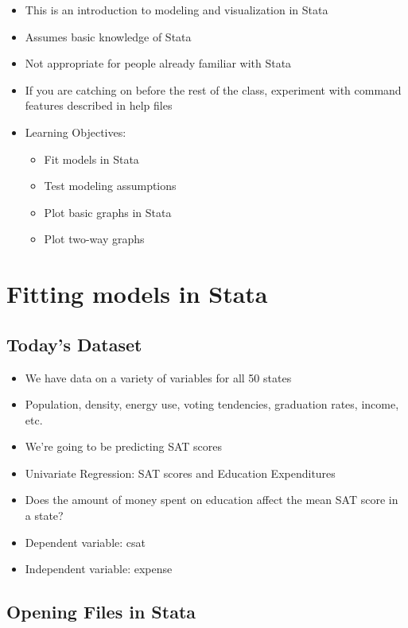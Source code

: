 \documentclass[]{book}
\providecommand{\tightlist}{%
  \setlength{\itemsep}{0pt}\setlength{\parskip}{0pt}}
\begin{document}
\begin{itemize}
\tightlist
\item
  This is an introduction to modeling and visualization in Stata
\item
  Assumes basic knowledge of Stata
\item
  Not appropriate for people already familiar with Stata
\item
  If you are catching on before the rest of the class, experiment with
  command features described in help files
\item
  Learning Objectives:

  \begin{itemize}
  \tightlist
  \item
    Fit models in Stata
  \item
    Test modeling assumptions
  \item
    Plot basic graphs in Stata
  \item
    Plot two-way graphs
  \end{itemize}
\end{itemize}

\section{Fitting models in Stata}\label{fitting-models-in-stata}

\subsection{Today's Dataset}\label{todays-dataset}

\begin{itemize}
\tightlist
\item
  We have data on a variety of variables for all 50 states
\item
  Population, density, energy use, voting tendencies, graduation rates,
  income, etc.
\item
  We're going to be predicting SAT scores
\item
  Univariate Regression: SAT scores and Education Expenditures
\item
  Does the amount of money spent on education affect the mean SAT score
  in a state?
\item
  Dependent variable: csat
\item
  Independent variable: expense
\end{itemize}

\subsection{Opening Files in Stata}\label{opening-files-in-stata-1}
\end{document}
